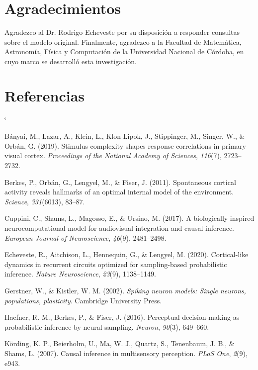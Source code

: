 \documentclass{llncs}
\makeatletter
\renewcommand{\bibsection}{\section*{Referencias}}
\renewenvironment{thebibliography}[1]{%
  \bibsection
  \list{}{%
    \setlength{\labelwidth}{0pt}%
    \setlength{\labelsep}{0pt}%
    \setlength{\leftmargin}{0pt}%
    \setlength{\itemindent}{0pt}%
    \setlength{\itemsep}{4pt plus 1pt}%
    \def\makelabel##1{}%
  }%
  \sloppy
  \sfcode`\.\@m
}{\endlist}
\makeatother
\begin{document}
\section{Agradecimientos}

Agradezco al Dr. Rodrigo Echeveste por su disposición a responder
consultas sobre el modelo original. Finalmente, agradezco a la
Facultad de Matemática, Astronomía, Física y Computación de la
Universidad Nacional de Córdoba, en cuyo marco se desarrolló esta
investigación.

\begin{thebibliography}{}

Bányai, M., Lazar, A., Klein, L., Klon-Lipok, J., Stippinger, M.,
Singer, W., \& Orbán, G. (2019). Stimulus complexity shapes response
correlations in primary visual cortex. \emph{Proceedings of the
National Academy of Sciences}, \emph{116}(7), 2723--2732.

Berkes, P., Orbán, G., Lengyel, M., \& Fiser, J. (2011). Spontaneous
cortical activity reveals hallmarks of an optimal internal model of
the environment. \emph{Science}, \emph{331}(6013), 83--87.

Cuppini, C., Shams, L., Magosso, E., \& Ursino, M. (2017). A
biologically inspired neurocomputational model for audiovisual
integration and causal inference. \emph{European Journal of
Neuroscience}, \emph{46}(9), 2481--2498.

Echeveste, R., Aitchison, L., Hennequin, G., \& Lengyel, M. (2020).
Cortical-like dynamics in recurrent circuits optimized for
sampling-based probabilistic inference. \emph{Nature Neuroscience},
\emph{23}(9), 1138--1149.

Gerstner, W., \& Kistler, W. M. (2002). \emph{Spiking neuron models:
Single neurons, populations, plasticity}. Cambridge University Press.

Haefner, R. M., Berkes, P., \& Fiser, J. (2016). Perceptual
decision-making as probabilistic inference by neural sampling.
\emph{Neuron}, \emph{90}(3), 649--660.

Körding, K. P., Beierholm, U., Ma, W. J., Quartz, S., Tenenbaum,
J. B., \& Shams, L. (2007). Causal inference in multisensory
perception. \emph{PLoS One}, \emph{2}(9), e943.


\end{thebibliography}
\end{document}
